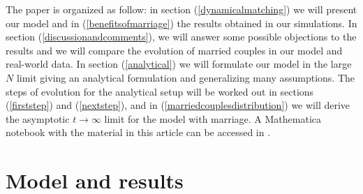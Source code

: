 \documentclass[12pt]{article}
\begin{document}
The paper is organized as follow: in section (\ref{dynamicalmatching}) we will present our model and in (\ref{benefitsofmarriage}) the results obtained in our simulations. In section (\ref{discussionandcomments}), we will answer some possible objections to the results and we will compare the evolution of married couples in our model and real-world data. In section (\ref{analytical}) we will formulate our model in the large $N$ limit giving an analytical formulation and generalizing many assumptions.
The steps of evolution for the analytical setup will be worked out in sections (\ref{firststep}) and (\ref{nextstep}), and in (\ref{marriedcouplesdistribution}) we will derive the asymptotic $t\rightarrow\infty$ limit for the model with marriage. 
A Mathematica notebook with the material in this article can be accessed in \cite{notebook}.






\section{Model and results}
\label{model}

\end{document}
